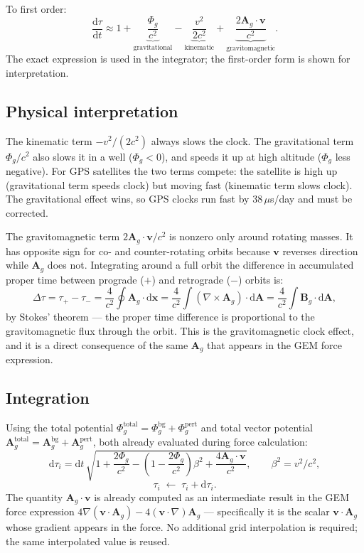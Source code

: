 \documentclass[11pt,a4paper]{article}
\newcommand{\vv}[1]{\mathbf{#1}}
\newcommand{\Phig}{\Phi_g}
\newcommand{\Ag}{\vv{A}_g}
\newcommand{\dd}{\mathrm{d}}
\begin{document}
To first order:
\begin{equation}
  \frac{\dd\tau}{\dd t} \approx 1 + \underbrace{\frac{\Phig}{c^2}}_{\text{gravitational}} - \underbrace{\frac{v^2}{2c^2}}_{\text{kinematic}} + \underbrace{\frac{2\Ag\cdot\vv{v}}{c^2}}_{\text{gravitomagnetic}}.
\end{equation}
The exact expression is used in the integrator; the first-order form is shown for interpretation.

\subsection{Physical interpretation}

The kinematic term $-v^2/(2c^2)$ always slows the clock.  The gravitational term $\Phig/c^2$ also slows it in a well ($\Phig<0$), and speeds it up at high altitude ($\Phig$ less negative).  For GPS satellites the two terms compete: the satellite is high up (gravitational term speeds clock) but moving fast (kinematic term slows clock).  The gravitational effect wins, so GPS clocks run fast by $38\,\mu$s/day and must be corrected.

The gravitomagnetic term $2\Ag\cdot\vv{v}/c^2$ is nonzero only around rotating masses.  It has opposite sign for co- and counter-rotating orbits because $\vv{v}$ reverses direction while $\Ag$ does not.  Integrating around a full orbit the difference in accumulated proper time between prograde ($+$) and retrograde ($-$) orbits is:
\begin{equation}
  \Delta\tau = \tau_+ - \tau_- = \frac{4}{c^2}\oint\Ag\cdot\dd\vv{x} = \frac{4}{c^2}\int(\nabla\times\Ag)\cdot\dd\vv{A} = \frac{4}{c^2}\int\vv{B}_g\cdot\dd\vv{A},
\end{equation}
by Stokes' theorem --- the proper time difference is proportional to the gravitomagnetic flux through the orbit.  This is the gravitomagnetic clock effect, and it is a direct consequence of the same $\Ag$ that appears in the GEM force expression.

\subsection{Integration}

Using the total potential $\Phig^{\mathrm{total}} = \Phig^{\mathrm{bg}} + \Phig^{\mathrm{pert}}$ and total vector potential $\Ag^{\mathrm{total}} = \Ag^{\mathrm{bg}} + \Ag^{\mathrm{pert}}$, both already evaluated during force calculation:
\begin{equation}
  \dd\tau_i = \dd t\,\sqrt{1 + \frac{2\Phig}{c^2} - \left(1-\frac{2\Phig}{c^2}\right)\beta^2 + \frac{4\Ag\cdot\vv{v}}{c^2}},
  \qquad \beta^2 = v^2/c^2,
\end{equation}
\begin{equation}
  \tau_i \;\leftarrow\; \tau_i + \dd\tau_i.
\end{equation}
The quantity $\Ag\cdot\vv{v}$ is already computed as an intermediate result in the GEM force expression $4\nabla(\vv{v}\cdot\Ag) - 4(\vv{v}\cdot\nabla)\Ag$ --- specifically it is the scalar $\vv{v}\cdot\Ag$ whose gradient appears in the force.  No additional grid interpolation is required; the same interpolated value is reused.
\end{document}
